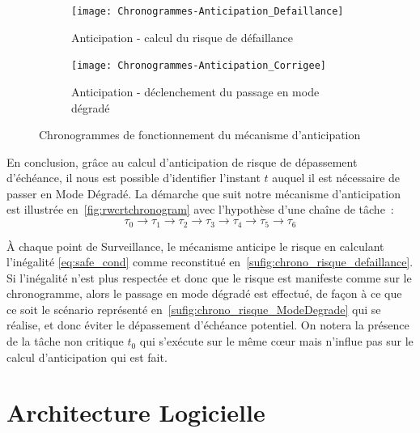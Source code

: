 \documentclass[french, a4paper, 11pt, twoside, pdftex]{StyleThese}
\begin{document}
	\begin{figure}[ht]
		\centering
		\begin{subfigure}{0.7\textwidth} \centering
			\texttt{[image: Chronogrammes-Anticipation\_Defaillance]}
			\caption[Anticipation - risque de défaillance]{Anticipation - calcul du risque de défaillance}
			\label{sufig:chrono_risque_defaillance}
		\end{subfigure}
		\begin{subfigure}{0.7\textwidth} \centering
			\texttt{[image: Chronogrammes-Anticipation\_Corrigee]}
			\caption[Anticipation - passage en mode dégradé]{Anticipation - déclenchement du passage en mode dégradé}
			\label{sufig:chrono_risque_ModeDegrade}
		\end{subfigure}
		\caption{Chronogrammes de fonctionnement du mécanisme d'anticipation}
		\label{fig:rwcrtchronogram}
	\end{figure}

    En conclusion, grâce au calcul d'anticipation de risque de dépassement d'échéance, il nous est possible d'identifier l'instant $t$ auquel il est nécessaire de passer en Mode Dégradé. La démarche que suit notre mécanisme d'anticipation est illustrée en~\autoref{fig:rwcrtchronogram} avec l'hypothèse d'une chaîne de tâche~:    \[ \tau_{0} \rightarrow \tau_{1} \rightarrow \tau_{2} \rightarrow \tau_{3} \rightarrow \tau_{4} \rightarrow \tau_{5} \rightarrow \tau_{6} \] 
     
     À chaque point de Surveillance, le mécanisme anticipe le risque en calculant l'inégalité \ref{eq:safe_cond} comme reconstitué en~\autoref{sufig:chrono_risque_defaillance}. Si l'inégalité n'est plus respectée et donc que le risque est manifeste comme sur le chronogramme, alors le passage en mode dégradé est effectué, de façon à ce que ce soit le scénario représenté en~\autoref{sufig:chrono_risque_ModeDegrade} qui se réalise, et donc éviter le dépassement d'échéance potentiel. On notera la présence de la tâche non critique $t_0$ qui s'exécute sur le même cœur mais n'influe pas sur le calcul d'anticipation qui est fait.
	
	\section{Architecture Logicielle}
	
\end{document}

